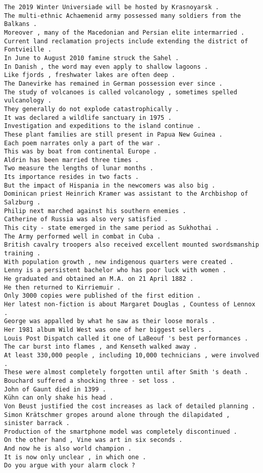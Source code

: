 \begin{verbatim}
The 2019 Winter Universiade will be hosted by Krasnoyarsk .
The multi-ethnic Achaemenid army possessed many soldiers from the Balkans .
Moreover , many of the Macedonian and Persian elite intermarried .
Current land reclamation projects include extending the district of Fontvieille .
In June to August 2010 famine struck the Sahel .
In Danish , the word may even apply to shallow lagoons .
Like fjords , freshwater lakes are often deep .
The Danevirke has remained in German possession ever since .
The study of volcanoes is called volcanology , sometimes spelled vulcanology .
They generally do not explode catastrophically .
It was declared a wildlife sanctuary in 1975 .
Investigation and expeditions to the island continue .
These plant families are still present in Papua New Guinea .
Each poem narrates only a part of the war .
This was by boat from continental Europe .
Aldrin has been married three times .
Two measure the lengths of lunar months .
Its importance resides in two facts .
But the impact of Hispania in the newcomers was also big .
Dominican priest Heinrich Kramer was assistant to the Archbishop of Salzburg .
Philip next marched against his southern enemies .
Catherine of Russia was also very satisfied .
This city - state emerged in the same period as Sukhothai .
The Army performed well in combat in Cuba .
British cavalry troopers also received excellent mounted swordsmanship training .
With population growth , new indigenous quarters were created .
Lenny is a persistent bachelor who has poor luck with women .
He graduated and obtained an M.A. on 21 April 1882 .
He then returned to Kirriemuir .
Only 3000 copies were published of the first edition .
Her latest non-fiction is about Margaret Douglas , Countess of Lennox .
George was appalled by what he saw as their loose morals .
Her 1981 album Wild West was one of her biggest sellers .
Louis Post Dispatch called it one of LaBeouf 's best performances .
The car burst into flames , and Kenseth walked away .
At least 330,000 people , including 10,000 technicians , were involved .
These were almost completely forgotten until after Smith 's death .
Bouchard suffered a shocking three - set loss .
John of Gaunt died in 1399 .
Kühn can only shake his head .
Von Beust justified the cost increases as lack of detailed planning .
Simon Krätschmer gropes around alone through the dilapidated , sinister barrack .
Production of the smartphone model was completely discontinued .
On the other hand , Vine was art in six seconds .
And now he is also world champion .
It is now only unclear , in which one .
Do you argue with your alarm clock ?

\end{verbatim}
